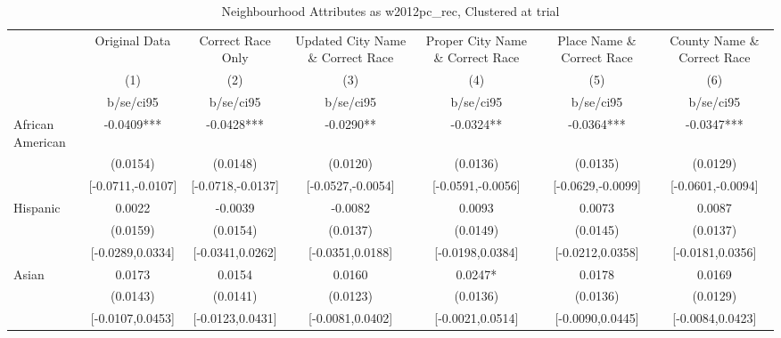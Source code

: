 \documentclass{article}
\begin{document}
\begin{table}[htbp]\centering
\def\sym#1{\ifmmode^{#1}\else\(^{#1}\)\fi}
\caption{Neighbourhood Attributes as w2012pc\_rec, Clustered at trial}
\begin{tabular}{l*{6}{c}}
\toprule
                    &\multicolumn{1}{c}{Original Data}&\multicolumn{1}{c}{Correct Race Only}&\multicolumn{1}{c}{Updated City Name \& Correct Race}&\multicolumn{1}{c}{Proper City Name \& Correct Race}&\multicolumn{1}{c}{Place Name \& Correct Race}&\multicolumn{1}{c}{County Name \& Correct Race}\\\cmidrule(lr){2-2}\cmidrule(lr){3-3}\cmidrule(lr){4-4}\cmidrule(lr){5-5}\cmidrule(lr){6-6}\cmidrule(lr){7-7}
                    &\multicolumn{1}{c}{(1)}   &\multicolumn{1}{c}{(2)}   &\multicolumn{1}{c}{(3)}   &\multicolumn{1}{c}{(4)}   &\multicolumn{1}{c}{(5)}   &\multicolumn{1}{c}{(6)}   \\
                    &   b/se/ci95   &   b/se/ci95   &   b/se/ci95   &   b/se/ci95   &   b/se/ci95   &   b/se/ci95   \\
\midrule
African American    &     -0.0409***&     -0.0428***&     -0.0290** &     -0.0324** &     -0.0364***&     -0.0347***\\
                    &    (0.0154)   &    (0.0148)   &    (0.0120)   &    (0.0136)   &    (0.0135)   &    (0.0129)   \\
                    &[-0.0711,-0.0107]   &[-0.0718,-0.0137]   &[-0.0527,-0.0054]   &[-0.0591,-0.0056]   &[-0.0629,-0.0099]   &[-0.0601,-0.0094]   \\
Hispanic            &      0.0022   &     -0.0039   &     -0.0082   &      0.0093   &      0.0073   &      0.0087   \\
                    &    (0.0159)   &    (0.0154)   &    (0.0137)   &    (0.0149)   &    (0.0145)   &    (0.0137)   \\
                    &[-0.0289,0.0334]   &[-0.0341,0.0262]   &[-0.0351,0.0188]   &[-0.0198,0.0384]   &[-0.0212,0.0358]   &[-0.0181,0.0356]   \\
Asian               &      0.0173   &      0.0154   &      0.0160   &      0.0247*  &      0.0178   &      0.0169   \\
                    &    (0.0143)   &    (0.0141)   &    (0.0123)   &    (0.0136)   &    (0.0136)   &    (0.0129)   \\
                    &[-0.0107,0.0453]   &[-0.0123,0.0431]   &[-0.0081,0.0402]   &[-0.0021,0.0514]   &[-0.0090,0.0445]   &[-0.0084,0.0423]   \\

\end{tabular}
\end{table}
\end{document}
